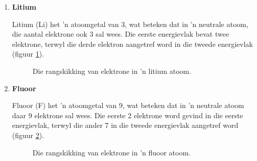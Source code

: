 \begin{enumerate}[noitemsep, label=\textbf{\arabic*}. ] 

\item{\textbf{Litium} \\
\begin{minipage}{.4\textwidth}
Litium (Li) het  'n atoomgetal van 3, wat beteken dat in  'n neutrale atoom, die aantal elektrone ook 3 sal wees. Die eerste energievlak bevat twee elektrone, terwyl die derde elektron aangetref word in die tweede energievlak (figuur \ref{fig:atom:lithium}).
\end{minipage}
\begin{minipage}{.6\textwidth}
\begin{figure}[H]
\begin{center}
\caption{Die rangskikking van elektrone in  'n litium atoom.}
\label{fig:atom:lithium}
\end{center}
\end{figure}
\end{minipage}
}

\item{\textbf{Fluoor} \\
\begin{minipage}{.4\textwidth}
Fluoor (F) het  'n atoomgetal van 9, wat beteken dat in  'n neutrale atoom daar 9 elektrone sal wees. Die eerste 2 elektrone word gevind in die eerste energievlak, terwyl die ander 7 in die tweede energievlak aangetref word (figuur \ref{fig:atom:fluorine}).
\end{minipage}
\begin{minipage}{.6\textwidth}
\begin{figure}[H]
\begin{center}
\caption{Die rangskikking van elektrone in  'n fluoor atoom.}
\label{fig:atom:fluorine}
\end{center}
\end{figure}
\end{minipage}
}


\end{enumerate}
